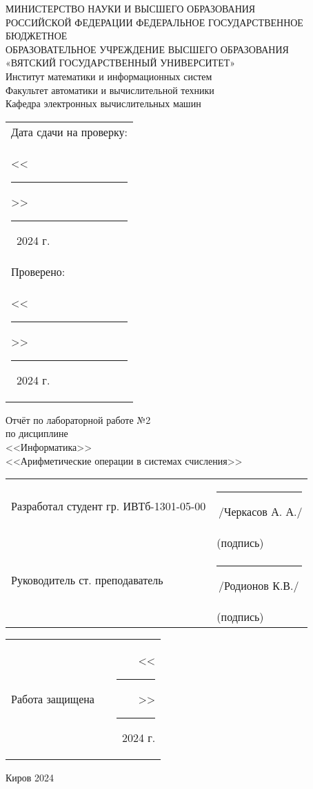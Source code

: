 \documentclass[oneside,a4paper,14pt]{extarticle}
\begin{document}
  
\newpage\thispagestyle{empty}
  \begin{center}
      МИНИСТЕРСТВО НАУКИ И ВЫСШЕГО ОБРАЗОВАНИЯ\\
      РОССИЙСКОЙ ФЕДЕРАЦИИ
      ФЕДЕРАЛЬНОЕ ГОСУДАРСТВЕННОЕ БЮДЖЕТНОЕ\\
      ОБРАЗОВАТЕЛЬНОЕ
      УЧРЕЖДЕНИЕ ВЫСШЕГО ОБРАЗОВАНИЯ\\
      «ВЯТСКИЙ ГОСУДАРСТВЕННЫЙ УНИВЕРСИТЕТ»\\
      Институт математики и информационных систем\\
      Факультет автоматики и вычислительной техники\\
      Кафедра электронных вычислительных машин
  \end{center}
  \vspace{10mm}
  
  \hfill
  \begin{tabular}{l}
    \footnotesize Дата сдачи на проверку: \\
    \footnotesize <<\rule[-1mm]{5mm}{0.10mm}\/>>\rule[-1mm]{20mm}{0.10mm}\ 2024 г.\\
    \footnotesize Проверено: \\
    \footnotesize <<\rule[-1mm]{5mm}{0.10mm}\/>>\rule[-1mm]{20mm}{0.10mm}\ 2024 г. \\
  \end{tabular}
  \vfill
  
  \begin{center}
    Отчёт по лабораторной работе №2\\
    по дисциплине\\
    <<Информатика>>\\
    <<Арифметические операции в системах счисления>>\\
  \end{center}
  \vspace{40mm}

  \noindent
  \begin{tabular}{ll}
    Разработал студент гр. ИВТб-1301-05-00 & \rule[-1mm]{30mm}{0.10mm}\,/Черкасов А. А./\\
    & \hspace{8mm}\footnotesize(подпись)\\
     
    Руководитель ст. преподаватель & \rule[-1mm]{30mm}{0.10mm}\,/Родионов К.В./\\
    & \hspace{8mm}\footnotesize(подпись)\\
  \end{tabular}
  
  \noindent
  \begin{tabular}{lp{58mm}r}
    Работа защищена &  & <<\rule[-1mm]{5mm}{0.10mm}\/>>\rule[-1mm]{30mm}{0.10mm}\ 2024 г.
  \end{tabular}
  \vfill
  
  \begin{center}
    Киров 2024
  \end{center}
  
\end{document}
